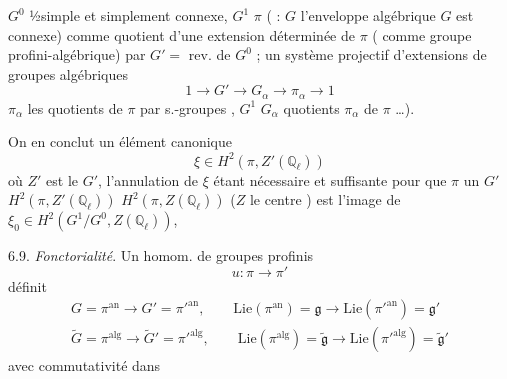 \documentclass[11pt,a4paper]{article}
\begin{document}
$G^{0}$  ½simple et simplement connexe, \ill{}
\ill{} \ill{} $G^{1}$  $\pi$ ( : $G$ 
 l'enveloppe algébrique \ill{} $G$ est connexe) 
 comme quotient d'une extension  déterminée de
$\pi$ ( comme \ill{} groupe profini-algébrique) par
$G' = $ rev.   de $G^{0}$ ;
\ill{}  \ill{} un système projectif d'extensions de
groupes algébriques
\[
  1 \longrightarrow G' \longrightarrow G_\alpha \longrightarrow \pi_\alpha \longrightarrow 1
\]
\ill{} $\pi_\alpha$  les quotients de $\pi$ par 
s.-groupes  
 ,  
$G^{1}$    \ill{} $G_\alpha$
\ill{}  \ill{}  quotients $\pi_\alpha$ de
$\pi$ …).

On en conclut un élément canonique
\[
  \xi \in H^{2}(\pi, Z'(\mathbb{Q}_\ell))
\]
où $Z'$ est le   $G'$\struck{\ill{}},
l'annulation de $\xi$ étant nécessaire et suffisante pour que $\pi$ 
\ill{} \ill{} un \uncertain{\ill{}}  \ill{} \ill{}
  \struck{\ill{}} \ill{} \ill{} \ill{}
  $G'$  \ill{} $H^{2}(\pi, Z'(\mathbb{Q}_\ell))$
 $H^{2}(\pi, Z(\mathbb{Q}_\ell))$ ($Z$ le centre )
 est l'image de $\xi_0 \in H^{2}(G^{1}/G^{0}, Z(\mathbb{Q}_\ell))$,


6.9. \emph{Fonctorialité}. Un homom. de groupes profinis
\[
  u : \pi \longrightarrow \pi'
\]
définit
\begin{gather*}
  G = \pi^{\mathrm{an}} \to G' = \pi'^{\mathrm{an}}, \qquad
  \mathrm{Lie}(\pi^{\mathrm{an}}) = \mathfrak{g} \longrightarrow \mathrm{Lie}(\pi'^{\mathrm{an}}) = \mathfrak{g}' \\
  \widetilde{G} = \pi^{\mathrm{alg}} \to \widetilde{G}' = \pi'^{\mathrm{alg}}, \qquad
  \mathrm{Lie}(\pi^{\mathrm{alg}}) = \widetilde{\mathfrak{g}} \longrightarrow \mathrm{Lie}(\pi'^{\mathrm{alg}}) = \widetilde{\mathfrak{g}}'
  \end{gather*}
avec commutativité dans
\end{document}
